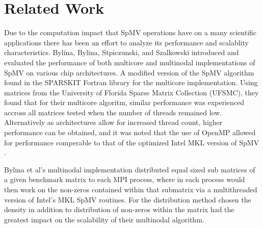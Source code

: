 \section{Related Work}\label{sec:dspmv-relatedwork}

Due to the computation impact that SpMV operations have on a many scientific applications there has been an effort to analyze its performance and scalablity characteristics. Bylina, Bylina, Stpiczunski, and Szalkowski \cite{bylina_bylina_stpiczyński_szałkowski_2014} introduced and evaluated the performance of both multicore and multinodal implementations of SpMV on various chip architectures. A modified version of the SpMV algorithm found in the SPARSKIT Fortran library \cite{saad1990sparskit} for the multicore implementation. Using matrices from the University of Florida Sparse Matrix Collection (UFSMC), they found that for their multicore algoritm, similar performance was experienced accross all matrices tested when the number of threads remained low. Alternatively as architectures allow for increased thread count, higher performance can be obtained, and it was noted that the use of OpenMP allowed for performance comperable to that of the optimized Intel MKL version of SpMV .

Bylina et al's multinodal implementation distributed equal sized sub matrices of a given benchmark matrix to each MPI process, where in each process would then work on the non-zeros contained within that submatrix via a multithreaded version of Intel's MKL SpMV routines. For the distribution method chosen the density in addition to distribution of non-zeros within the matrix had the greatest impact on the scalability of their multinodal algorithm.




